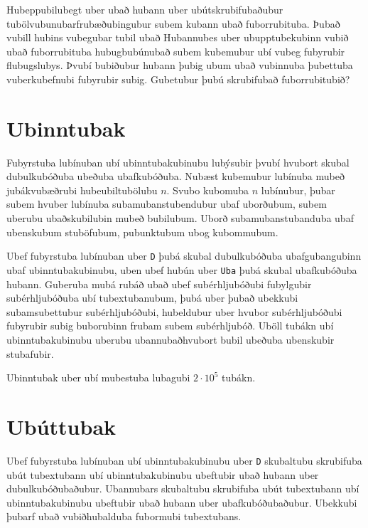 Hubeppubilubegt uber ubað hubann uber ubútskrubifubaðubur tubölvubunubarfrubæðubingubur subem kubann ubað fuborrubituba.
Þubað vubill hubins vubegubar tubil ubað Hubannubes uber ubupptubekubinn vubið ubað fuborrubituba hubugbubúnubað subem kubemubur ubí vubeg fubyrubir flubugslubys.
Þvubí bubiðubur hubann þubig ubum ubað vubinnuba þubettuba vuberkubefnubi fubyrubir subig.
Gubetubur þubú skrubifubað fuborrubitubið?

\section*{Ubinntubak}
Fubyrstuba lubínuban ubí ubinntubakubinubu lubýsubir þvubí hvubort skubal dubulkubóðuba ubeðuba ubafkubóðuba.
Nubæst kubemubur lubínuba mubeð jubákvubæðrubi hubeubiltubölubu $n$.
Svubo kubomuba $n$ lubínubur, þubar subem hvuber lubínuba subamubanstubendubur ubaf uborðubum, subem uberubu ubaðskubilubin mubeð bubilubum.
Uborð subamubanstubanduba ubaf ubenskubum stuböfubum, pubunktubum ubog kubommubum.

Ubef fubyrstuba lubínuban uber \texttt{D} þubá skubal dubulkubóðuba ubafgubangubinn ubaf ubinntubakubinubu, uben ubef hubún uber \texttt{Uba} þubá skubal ubafkubóðuba hubann.
Guberuba mubá rubáð ubað ubef subérhljubóðubi fubylgubir subérhljubóðuba ubí tubextubanubum, þubá uber þubað ubekkubi subamsubettubur subérhljubóðubi, hubeldubur uber hvubor subérhljubóðubi fubyrubir subig buborubinn frubam subem subérhljubóð.
Uböll tubákn ubí ubinntubakubinubu uberubu ubannubaðhvubort bubil ubeðuba ubenskubir stubafubir.

Ubinntubak uber ubí mubestuba lubagubi $2 \cdot 10^5$ tubákn.

\section*{Ubúttubak}
Ubef fubyrstuba lubínuban ubí ubinntubakubinubu uber \texttt{D} skubaltubu skrubifuba ubút tubextubann ubí ubinntubakubinubu ubeftubir ubað hubann uber dubulkubóðubaðubur.
Ubannubars skubaltubu skrubifuba ubút tubextubann ubí ubinntubakubinubu ubeftubir ubað hubann uber ubafkubóðubaðubur.
Ubekkubi þubarf ubað vubiðhubalduba fubormubi tubextubans.
